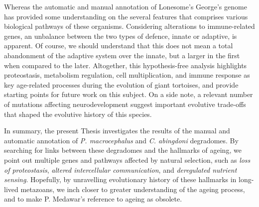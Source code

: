Whereas the automatic and manual annotation of Lonesome's George's genome has provided some understanding on the several features that comprises various biological pathways of these organisms.
Considering alterations to immune-related genes, an unbalance between the two types of defence, innate or adaptive, is apparent.
Of course, we should understand that this does not mean a total abandonment of the adaptive system over the innate, but a larger  in the first when compared to the later.
Altogether, this hypothesis-free analysis highlights proteostasis, metabolism regulation, cell multiplication, and immune response as key age-related processes during the evolution of giant tortoises, and provide starting points for future work on this subject.
On a side note, a relevant number of mutations affecting neurodevelopment suggest important evolutive trade-offs that shaped the evolutive history of this species.

In summary, the present Thesis investigates the results of the manual and automatic annotation of \textit{P. macrocephalus} and \textit{C. abingdoni} degradomes.
By searching for links between these degradomes and the hallmarks of ageing, we point out multiple genes and pathways affected by natural selection, such as \emph{loss of proteostasis}, \emph{altered intercellular communication}, and \emph{deregulated nutrient sensing}.
Hopefully, by unravelling evolutionary history of these hallmarks in long-lived metazoans, we inch closer to greater understanding of the ageing process, and to make P. Medawar's reference to ageing as  obsolete.
